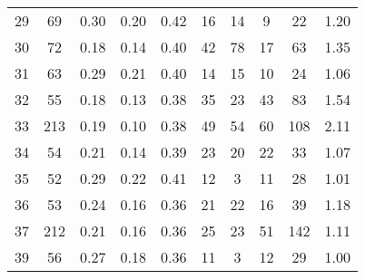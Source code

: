 \begin{tabular}{lccccccccc}
29 &       69 &                             0.30 &                             0.20 &                             0.42 &              16 &              14 &                                  9 &                              22 &       1.20 \\
30 &       72 &                             0.18 &                             0.14 &                             0.40 &              42 &              78 &                                 17 &                              63 &       1.35 \\
31 &       63 &                             0.29 &                             0.21 &                             0.40 &              14 &              15 &                                 10 &                              24 &       1.06 \\
32 &       55 &                             0.18 &                             0.13 &                             0.38 &              35 &              23 &                                 43 &                              83 &       1.54 \\
33 &      213 &                             0.19 &                             0.10 &                             0.38 &              49 &              54 &                                 60 &                             108 &       2.11 \\
34 &       54 &                             0.21 &                             0.14 &                             0.39 &              23 &              20 &                                 22 &                              33 &       1.07 \\
35 &       52 &                             0.29 &                             0.22 &                             0.41 &              12 &               3 &                                 11 &                              28 &       1.01 \\
36 &       53 &                             0.24 &                             0.16 &                             0.36 &              21 &              22 &                                 16 &                              39 &       1.18 \\
37 &      212 &                             0.21 &                             0.16 &                             0.36 &              25 &              23 &                                 51 &                             142 &       1.11 \\
39 &       56 &                             0.27 &                             0.18 &                             0.36 &              11 &               3 &                                 12 &                              29 &       1.00 \\

\end{tabular}
